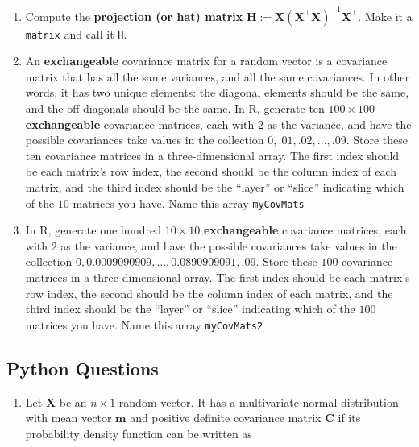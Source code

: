 \documentclass[
  12pt,
]{krantz}
\providecommand{\tightlist}{%
  \setlength{\itemsep}{0pt}\setlength{\parskip}{0pt}}
\begin{document}
\begin{enumerate}
\def\labelenumi{\alph{enumi}.}
\item
  Compute the \textbf{projection (or hat) matrix} \(\mathbf{H} := \mathbf{X}\left(\mathbf{X}^\intercal \mathbf{X}\right)^{-1} \mathbf{X}^\intercal\). Make it a \texttt{matrix} and call it \texttt{H}.
\item
  An \textbf{exchangeable} covariance matrix for a random vector is a covariance matrix that has all the same variances, and all the same covariances. In other words, it has two unique elements: the diagonal elements should be the same, and the off-diagonals should be the same. In R, generate ten \(100 \times 100\) \textbf{exchangeable} covariance matrices, each with \(2\) as the variance, and have the possible covariances take values in the collection \(0,.01,.02, ..., .09.\) Store these ten covariance matrices in a three-dimensional array. The first index should be each matrix's row index, the second should be the column index of each matrix, and the third index should be the ``layer'' or ``slice'' indicating which of the \(10\) matrices you have. Name this array \texttt{myCovMats}
\item
  In R, generate one hundred \(10 \times 10\) \textbf{exchangeable} covariance matrices, each with \(2\) as the variance, and have the possible covariances take values in the collection \(0,0.0009090909, ..., 0.0890909091, .09.\) Store these \(100\) covariance matrices in a three-dimensional array. The first index should be each matrix's row index, the second should be the column index of each matrix, and the third index should be the ``layer'' or ``slice'' indicating which of the \(100\) matrices you have. Name this array \texttt{myCovMats2}
\end{enumerate}

\hypertarget{python-questions-2}{%
\subsection{Python Questions}\label{python-questions-2}}

\begin{enumerate}
\def\labelenumi{\arabic{enumi}.}
\tightlist
\item
  Let \(\mathbf{X}\) be an \(n \times 1\) random vector. It has a multivariate normal distribution with mean vector \(\mathbf{m}\) and positive definite covariance matrix \(\mathbf{C}\) if its probability density function can be written as
\end{enumerate}
\end{document}
